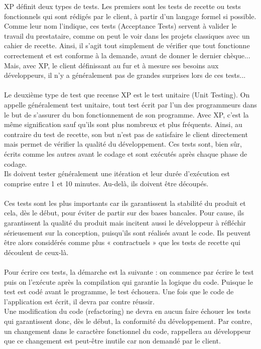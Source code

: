 \documentclass[]{article}
\begin{document}
XP définit deux types de tests. Les premiers sont les tests de recette
ou tests fonctionnels qui sont rédigés par le client, à partir d'un
langage formel si possible. Comme leur nom l'indique, ces tests
(Acceptance Tests) servent à valider le travail du prestataire, comme on
peut le voir dans les projets classiques avec un cahier de recette.
Ainsi, il s'agit tout simplement de vérifier que tout fonctionne
correctement et est conforme à la demande, avant de donner le dernier
chèque... Mais, avec XP, le client définissant au fur et à mesure ses
besoins aux développeurs, il n'y a généralement pas de grandes surprises
lors de ces tests...\\
~\\
Le deuxième type de test que recense XP est le test unitaire (Unit
Testing). On appelle généralement test unitaire, tout test écrit par
l'un des programmeurs dans le but de s'assurer du bon fonctionnement de
son programme. Avec XP, c'est la même signification sauf qu'ils sont
plus nombreux et plus fréquents. Ainsi, au contraire du test de recette,
son but n'est pas de satisfaire le client directement mais permet de
vérifier la qualité du développement. Ces tests sont, bien sûr, écrits
comme les autres avant le codage et sont exécutés après chaque phase de
codage.\\
Ils doivent tester généralement une itération et leur durée d'exécution
est comprise entre 1 et 10 minutes. Au-delà, ils doivent être
découpés.\\
~\\
Ces tests sont les plus importants car ils garantissent la stabilité du
produit et cela, dès le début, pour éviter de partir sur des bases
bancales. Pour cause, ils garantissent la qualité du produit mais
incitent aussi le développeur à réfléchir sérieusement sur la
conception, puisqu'ils sont réalisés avant le code. Ils peuvent être
alors considérés comme plus « contractuels » que les tests de recette
qui découlent de ceux-là.\\
~\\
Pour écrire ces tests, la démarche est la suivante : on commence par
écrire le test puis on l'exécute après la compilation qui garantie la
logique du code. Puisque le test est codé avant le programme, le test
échouera. Une fois que le code de l'application est écrit, il devra par
contre réussir.~\\
Une modification du code (refactoring) ne devra en aucun faire échouer
les tests qui garantissent donc, dès le début, la conformité du
développement. Par contre, un changement dans le caractère fonctionnel
du code, rappellera au développeur que ce changement est peut-être
inutile car non demandé par le client.~
\end{document}
